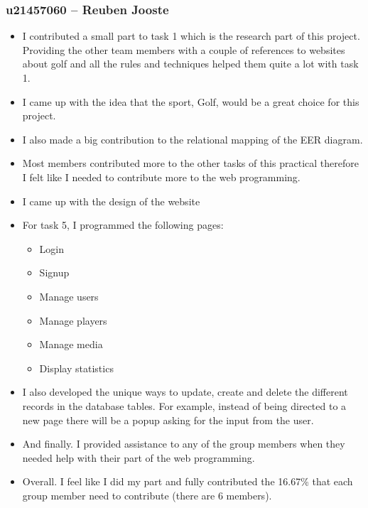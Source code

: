 \documentclass[titlepage]{article}
\begin{document}
\subsubsection*{u21457060 – Reuben Jooste}
\vspace{1em}
\begin{itemize}
  \item I contributed a small part to task 1 which is the research part of this project. Providing the other team members
        with a couple of references to websites about golf and all the rules and techniques helped them quite a lot with task 1.
  \item I came up with the idea that the sport, Golf, would be a great choice for this project.
  \item I also made a big contribution to the relational mapping of the EER diagram.
  \item Most members contributed more to the other tasks of this practical therefore I felt like I needed to contribute
        more to the web programming.
  \item I came up with the design of the website
  \item For task 5, I programmed the following pages:
  \begin{itemize}
    \item Login 
    \item Signup 
    \item Manage users
    \item Manage players
    \item Manage media
    \item Display statistics
  \end{itemize}
  \item I also developed the unique ways to update, create and delete the different records in the database tables. 
        For example, instead of being directed to a new page there will be a popup asking for the input from the user.
  \item And finally. I provided assistance to any of the group members when they needed help with their part of the
        web programming.
  \item Overall. I feel like I did my part and fully contributed the 16.67\% that each group member need to contribute (there are 6 members).
\end{itemize}






\vspace{1em}
\end{document}
